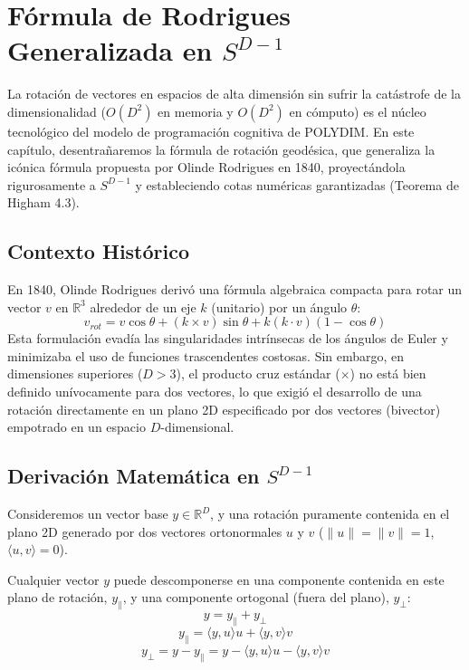 \chapter{Fórmula de Rodrigues Generalizada en $S^{D-1}$}


La rotación de vectores en espacios de alta dimensión sin sufrir la catástrofe de la dimensionalidad ($O(D^2)$ en memoria y $O(D^2)$ en cómputo) es el núcleo tecnológico del modelo de programación cognitiva de POLYDIM. En este capítulo, desentrañaremos la fórmula de rotación geodésica, que generaliza la icónica fórmula propuesta por Olinde Rodrigues en 1840, proyectándola rigurosamente a $S^{D-1}$ y estableciendo cotas numéricas garantizadas (Teorema de Higham 4.3).

\section{Contexto Histórico}
En 1840, Olinde Rodrigues derivó una fórmula algebraica compacta para rotar un vector $v$ en $\mathbb{R}^3$ alrededor de un eje $k$ (unitario) por un ángulo $\theta$:
\begin{equation}
    v_{rot} = v \cos\theta + (k \times v) \sin\theta + k(k \cdot v)(1 - \cos\theta)
\end{equation}
Esta formulación evadía las singularidades intrínsecas de los ángulos de Euler y minimizaba el uso de funciones trascendentes costosas. Sin embargo, en dimensiones superiores ($D > 3$), el producto cruz estándar ($\times$) no está bien definido unívocamente para dos vectores, lo que exigió el desarrollo de una rotación directamente en un plano 2D especificado por dos vectores (bivector) empotrado en un espacio $D$-dimensional.

\section{Derivación Matemática en $S^{D-1}$}
Consideremos un vector base $y \in \mathbb{R}^D$, y una rotación puramente contenida en el plano 2D generado por dos vectores ortonormales $u$ y $v$ ($\|u\|=\|v\|=1$, $\langle u, v \rangle = 0$).

Cualquier vector $y$ puede descomponerse en una componente contenida en este plano de rotación, $y_\parallel$, y una componente ortogonal (fuera del plano), $y_\perp$:
\begin{equation}
    y = y_\parallel + y_\perp
\end{equation}
\begin{equation}
    y_\parallel = \langle y, u \rangle u + \langle y, v \rangle v
\end{equation}
\begin{equation}
    y_\perp = y - y_\parallel = y - \langle y, u \rangle u - \langle y, v \rangle v
\end{equation}

